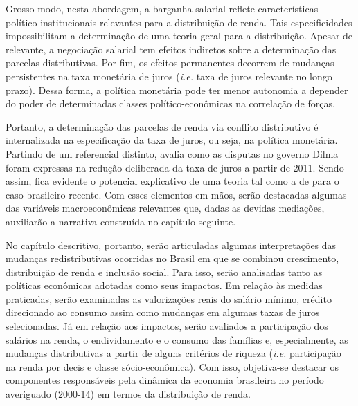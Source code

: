 Grosso modo, nesta abordagem, a
barganha salarial reflete características político-institucionais relevantes para a distribuição de
renda. Tais especificidades impossibilitam a determinação de uma teoria geral para a distribuição. Apesar de relevante, a negociação salarial tem efeitos indiretos sobre a
determinação das parcelas distributivas. Por fim, os efeitos permanentes decorrem de mudanças persistentes na taxa monetária de juros (\textit{i.e.} taxa de juros relevante no longo prazo).
Dessa forma, a política monetária pode ter menor autonomia a depender do poder de
determinadas classes político-econômicas na correlação de forças. 

Portanto, a determinação das parcelas de renda via conflito distributivo é internalizada na especificação da taxa de juros, ou seja, na política monetária. Partindo de um referencial distinto, \textcite{singer_cutucando_2015} avalia como as disputas no governo Dilma foram expressas na redução deliberada da taxa de juros a partir de 2011. Sendo assim, fica evidente o potencial explicativo de uma teoria tal como a de \textcite{pivetti_essay_1992} para o caso brasileiro recente. Com esses elementos em mãos, serão destacadas algumas das variáveis macroeconômicas relevantes que, dadas as devidas mediações, auxiliarão a narrativa construída no capítulo seguinte.




No capítulo descritivo, portanto, serão articuladas algumas interpretações das mudanças redistributivas ocorridas no Brasil em que se combinou crescimento, distribuição de renda e inclusão social. Para isso, serão analisadas tanto as políticas econômicas adotadas como seus impactos. Em relação às medidas praticadas, serão examinadas as valorizações reais do salário mínimo, crédito direcionado ao consumo assim como mudanças em algumas taxas de juros selecionadas. Já em relação aos impactos, serão avaliados a participação dos salários na renda, o endividamento e  o consumo das famílias e, especialmente, as mudanças distributivas a partir de alguns critérios de riqueza (\textit{i.e.} participação na renda por decis e classe sócio-econômica). Com isso, objetiva-se destacar os componentes responsáveis pela dinâmica da economia brasileira no período averiguado (2000-14) em termos da distribuição de renda. 


